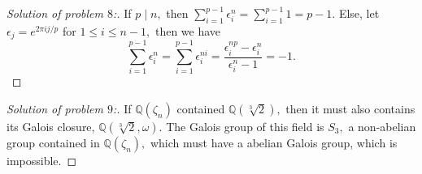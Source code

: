 \documentclass[letterpaper,11pt,twoside]{article}
\theoremstyle{proposition}
\theoremstyle{definition}
\theoremstyle{theorem}
\theoremstyle{definition}
\theoremstyle{definition}
\theoremstyle{definition}
\theoremstyle{lemma}
\theoremstyle{definition}
\theoremstyle{definition}
\theoremstyle{corollary}
\theoremstyle{definition}
\theoremstyle{definition}
\theoremstyle{definition}
\renewcommand{\div}{\;\vert\;}
\begin{document}
\begin{proof}[Solution of problem $8$:]
	If $p \div n,$ then $\sum_{i=1}^{p-1} \epsilon_i^n = \sum_{i=1}^{p-1} 1= p-1. $
	Else, let $\epsilon_j = e^{2\pi ij/p}$ for $1 \leq i \leq n-1,$ then we have 
	$$ \sum_{i=1}^{p-1} \epsilon_i^n= \sum_{i=1}^{p-1} \epsilon_i^{ni}= \frac{\epsilon_i^{np}- \epsilon_i^n}{\epsilon_i^n-1}=-1. $$
\end{proof}
\begin{proof}[Solution of problem $9$:]
	If $\mathbb{Q}(\zeta_n)$ contained $\mathbb{Q}(\sqrt[3]{2}),$ then it must also contains its Galois closure, $\mathbb{Q}(\sqrt[3]{2}, \omega).$ The 
	Galois group of this field is $S_3,$ a non-abelian group contained in $\mathbb{Q}(\zeta_n),$ which must have a abelian Galois group, which is 
	impossible. 
\end{proof}
\end{document}
